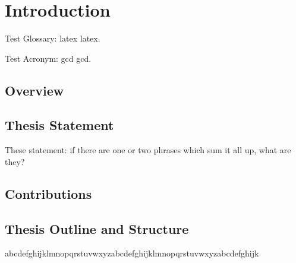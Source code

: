 \chapter{Introduction}

Test Glossary: \Gls{latex} \gls{latex}.

Test Acronym: \acrlong{gcd} \acrshort{gcd}.

\section{Overview}

\section{Thesis Statement}

These statement: if there are one or two phrases which sum it all up, what are they?

\section{Contributions}

\section{Thesis Outline and Structure}

abcdefghijklmnopqrstuvwxyzabcdefghijklmnopqrstuvwxyzabcdefghijk